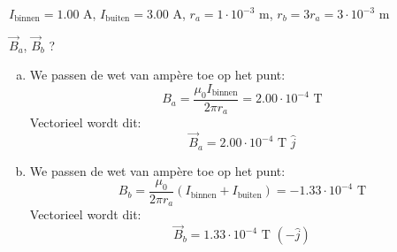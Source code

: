 \begin{description}[labelwidth=1.5cm, leftmargin=!]
    \item[Geg. :]   $I_{\text{binnen}} = 1.00$ A, $I_{\text{buiten}} = 3.00$ A, $r_a = 1 \cdot 10^{-3}$ m, $r_b = 3r_a = 3 \cdot 10^{-3}$ m
    \item[Gevr. :]  $\Vec{B}_a$, $\Vec{B}_b$ ?
    \item[Opl. :]   
                    \begin{enumerate}[(a)]
                        \item
                            We passen de wet van ampère toe op het punt:
                            \begin{equation*}
                                B_a = \dfrac{\mu_0I_{\text{binnen}}}{2\pi r_a} = 2.00 \cdot 10^{-4} \text{ T}
                            \end{equation*}
                            Vectorieel wordt dit:
                            \begin{equation*}
                                \Vec{B}_a = 2.00 \cdot 10^{-4} \text{ T } \hat{j}
                            \end{equation*}
                        \item 
                            We passen de wet van ampère toe op het punt:
                            \begin{equation*}
                                B_b = \dfrac{\mu_0}{2\pi r_a}(I_{\text{binnen}} + I_{\text{buiten}}) = -1.33 \cdot 10^{-4} \text{ T}
                            \end{equation*}
                            Vectorieel wordt dit:
                            \begin{equation*}
                                \Vec{B}_b = 1.33 \cdot 10^{-4} \text{ T }  (-\hat{j})
                            \end{equation*}
                    \end{enumerate}

                    
\end{description}

\vspace{1cm}
